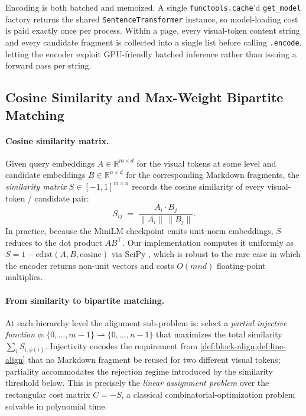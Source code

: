 \documentclass{article}
\theoremstyle{definition}
\begin{document}
Encoding is both batched and memoized.  A single
\texttt{functools.cache}'d \texttt{get\_model} factory returns the
shared \texttt{SentenceTransformer} instance, so model-loading cost
is paid exactly once per process.  Within a page, every visual-token
content string and every candidate fragment is collected into a
single list before calling \texttt{.encode}, letting the encoder
exploit GPU-friendly batched inference rather than issuing a forward
pass per string.

\subsection{Cosine Similarity and Max-Weight Bipartite Matching}
\label{sec:match}

\paragraph{Cosine similarity matrix.}
Given query embeddings $A \in \mathbb{R}^{m \times d}$ for the visual
tokens at some level and candidate embeddings $B \in \mathbb{R}^{n
            \times d}$ for the corresponding Markdown fragments, the
\emph{similarity matrix} $S \in [-1, 1]^{m \times n}$ records the
cosine similarity of every visual-token / candidate pair:
\[
      S_{ij} \;=\; \frac{A_i \cdot B_j}{\lVert A_i\rVert\,\lVert B_j\rVert}.
\]
In practice, because the MiniLM checkpoint emits unit-norm embeddings,
$S$ reduces to the dot product $A B^{\top}$.  Our implementation
computes it uniformly as $S = 1 - \mathrm{cdist}(A, B, \text{cosine})$
via SciPy \cite{virtanen2020scipy}, which is robust to the rare case
in which the encoder returns non-unit vectors and costs $O(m n d)$
floating-point multiplies.

\paragraph{From similarity to bipartite matching.}
At each hierarchy level the alignment sub-problem is: select a
\emph{partial injective function} $\phi : \{0, \ldots, m{-}1\}
      \rightharpoonup \{0, \ldots, n{-}1\}$ that maximizes the total
similarity $\sum_i S_{i, \phi(i)}$.  Injectivity encodes the
requirement from \cref{def:block-align,def:line-align} that no
Markdown fragment be reused for two different visual tokens;
partiality accommodates the rejection regime introduced by the
similarity threshold below.  This is precisely the \emph{linear
      assignment problem} over the rectangular cost matrix
$C = -S$, a classical combinatorial-optimization problem solvable in
polynomial time.
\end{document}
